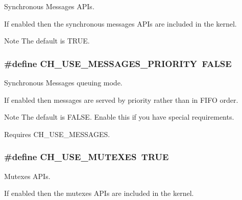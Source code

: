 Synchronous Messages A\+P\+Is. 

If enabled then the synchronous messages A\+P\+Is are included in the kernel.

\begin{DoxyNote}{Note}
The default is {\ttfamily T\+R\+U\+E}. 
\end{DoxyNote}
\hypertarget{group__config_gaf48947f33ed7a44a7701d84d83d94a1c}{}
\subsubsection[{C\+H\+\_\+\+U\+S\+E\+\_\+\+M\+E\+S\+S\+A\+G\+E\+S\+\_\+\+P\+R\+I\+O\+R\+I\+T\+Y}]{\setlength{\rightskip}{0pt plus 5cm}\#define C\+H\+\_\+\+U\+S\+E\+\_\+\+M\+E\+S\+S\+A\+G\+E\+S\+\_\+\+P\+R\+I\+O\+R\+I\+T\+Y~F\+A\+L\+S\+E}\label{group__config_gaf48947f33ed7a44a7701d84d83d94a1c}


Synchronous Messages queuing mode. 

If enabled then messages are served by priority rather than in F\+I\+F\+O order.

\begin{DoxyNote}{Note}
The default is {\ttfamily F\+A\+L\+S\+E}. Enable this if you have special requirements. 

Requires {\ttfamily C\+H\+\_\+\+U\+S\+E\+\_\+\+M\+E\+S\+S\+A\+G\+E\+S}. 
\end{DoxyNote}
\hypertarget{group__config_ga4f461a7b5edbff2405b7b40d2bb238a6}{}
\subsubsection[{C\+H\+\_\+\+U\+S\+E\+\_\+\+M\+U\+T\+E\+X\+E\+S}]{\setlength{\rightskip}{0pt plus 5cm}\#define C\+H\+\_\+\+U\+S\+E\+\_\+\+M\+U\+T\+E\+X\+E\+S~T\+R\+U\+E}\label{group__config_ga4f461a7b5edbff2405b7b40d2bb238a6}


Mutexes A\+P\+Is. 

If enabled then the mutexes A\+P\+Is are included in the kernel.

